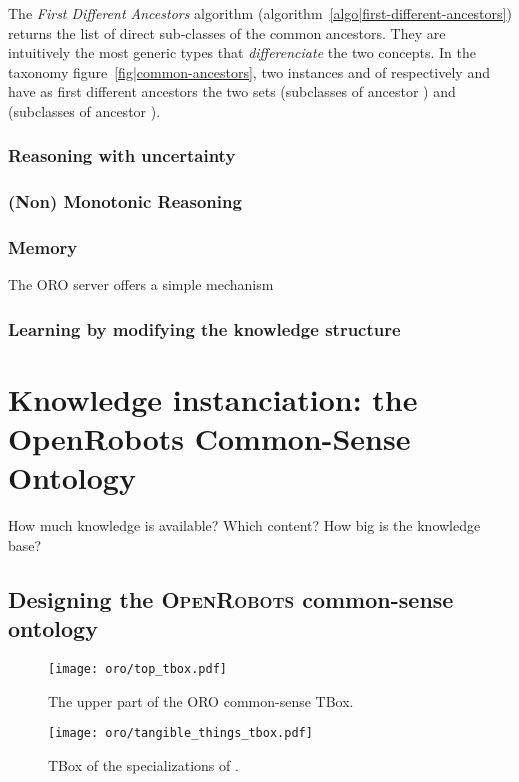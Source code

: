 The \emph{First Different Ancestors} algorithm
(algorithm~\ref{algo|first-different-ancestors}) returns the list of direct
sub-classes of the common ancestors. They are intuitively the most generic
types that \emph{differenciate} the two concepts. In the taxonomy
figure~\ref{fig|common-ancestors}, two instances  and  of
respectively  and  have as first different
ancestors the two sets  (subclasses of ancestor
) and  (subclasses of
ancestor ).

\subsubsection{Reasoning with uncertainty}
\subsubsection{(Non) Monotonic Reasoning}


\subsubsection{Memory}
\label{subssect|memory}

The ORO server offers a simple mechanism

\subsubsection{Learning by modifying the knowledge structure}




\section{Knowledge instanciation: the OpenRobots Common-Sense Ontology}

How much knowledge is available? Which content? How big is the knowledge base?

\subsection{Designing the \textsc{OpenRobots} common-sense ontology}
\label{sect|commonsense-design}

\begin{figure}
    \centering
    \texttt{[image: oro/top\_tbox.pdf]}
    \caption{The upper part of the ORO common-sense TBox.}
    \label{fig|upper_tbox}
\end{figure}

\begin{figure}
    \centering
    \texttt{[image: oro/tangible\_things\_tbox.pdf]}
    \caption{TBox of the specializations of .}
    \label{fig|tangible_things_tbox}
\end{figure}
